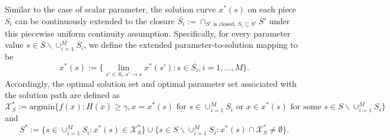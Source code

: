 \documentclass[mnsc,blindrev]{informs4} %
\begin{document}
Similar to the case of scalar parameter, the solution curve $x^*(s)$ on each piece $S_i$ can be continuously extended to the closure $\overline{S_i}:=\cap_{S'\text{ is closed, }S_i\subseteq S'}S'$ under this piecewise uniform continuity assumption. Specifically, for every parameter value $s\in S\backslash \cup_{i=1}^MS_i$, we define the extended parameter-to-solution mapping to be
\begin{equation*}
x^*(s):=\{\lim_{s'\in S_i,s'\to s}x^*(s'):s\in \overline{S_i},i=1,\ldots,M\}.
\end{equation*}
Accordingly, the optimal solution set and optimal parameter set associated with the solution path are defined as
\begin{equation}\label{optimal solution:multidimensional}
    \mathcal X_S^*:=\text{argmin}\{f(x):H(x)\geq \gamma,x=x^*(s)\text{ for }s\in\cup_{i=1}^MS_i\text{ or }x\in x^*(s)\text{ for some }s\in S\backslash \cup_{i=1}^MS_i\}
\end{equation}
and
\begin{equation*}
    S^*:=\{s\in\cup_{i=1}^MS_i:x^*(s)\in \mathcal X_S^*\}\cup\{s\in S\backslash \cup_{i=1}^MS_i:x^*(s) \cap \mathcal X_S^*\neq \emptyset\}.
\end{equation*}

\end{document}
